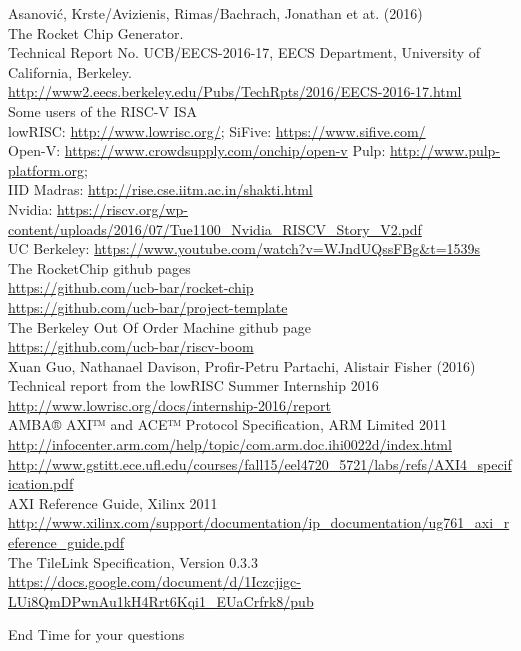 \documentclass[]{beamer} %
\begin{document}
\tiny
\begin{thebibliography}{9}
		Asanović, Krste/Avizienis, Rimas/Bachrach, Jonathan et at. (2016)\\
		The Rocket Chip Generator.\\
		Technical Report No. UCB/EECS-2016-17, EECS Department, University of California, Berkeley.\\
		\url{http://www2.eecs.berkeley.edu/Pubs/TechRpts/2016/EECS-2016-17.html}\\

		Some users of the RISC-V ISA\\
		lowRISC: \url{http://www.lowrisc.org/}; SiFive: \url{https://www.sifive.com/}\\
		Open-V: \url{https://www.crowdsupply.com/onchip/open-v} Pulp: \url{http://www.pulp-platform.org};\\
		IID Madras: \url{http://rise.cse.iitm.ac.in/shakti.html}\\
		Nvidia: \url{https://riscv.org/wp-content/uploads/2016/07/Tue1100_Nvidia_RISCV_Story_V2.pdf}\\
		UC Berkeley: \url{https://www.youtube.com/watch?v=WJndUQssFBg&t=1539s}\\

		The RocketChip github pages\\
		\url{https://github.com/ucb-bar/rocket-chip}\\
		\url{https://github.com/ucb-bar/project-template}\\

		The Berkeley Out Of Order Machine github page\\
		\url{https://github.com/ucb-bar/riscv-boom}\\

		Xuan Guo, Nathanael Davison, Profir-Petru Partachi, Alistair Fisher (2016)\\
		Technical report from the lowRISC Summer Internship 2016\\
		\url{http://www.lowrisc.org/docs/internship-2016/report}\\

		AMBA® AXI™ and ACE™ Protocol Specification, ARM Limited 2011\\
		\url{http://infocenter.arm.com/help/topic/com.arm.doc.ihi0022d/index.html}\\
		\url{http://www.gstitt.ece.ufl.edu/courses/fall15/eel4720_5721/labs/refs/AXI4_specification.pdf}\\

		AXI Reference Guide, Xilinx 2011\\
		\url{http://www.xilinx.com/support/documentation/ip_documentation/ug761_axi_reference_guide.pdf}\\

		The TileLink Specification, Version 0.3.3\\
		\url{https://docs.google.com/document/d/1Iczcjigc-LUi8QmDPwnAu1kH4Rrt6Kqi1_EUaCrfrk8/pub}

\end{thebibliography}


\begin{frame}{\Huge End}
	\huge Time for your questions
\end{frame}
\end{document}
